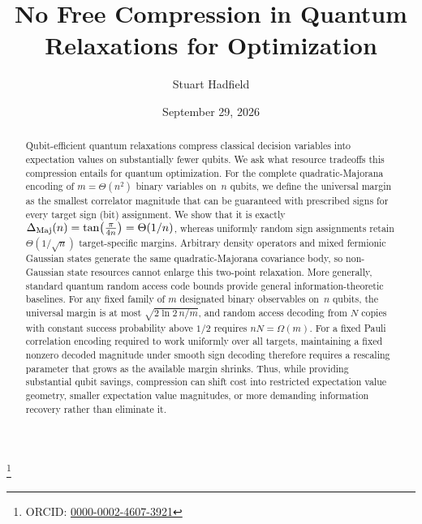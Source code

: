 \documentclass[10pt,aps,pra,twocolumn,superscriptaddress,nofootinbib,longbibliography]{revtex4-2}
\begin{document}
\title{No Free Compression in Quantum Relaxations for Optimization}

\author{Stuart Hadfield}
\thanks{ORCID: \href{https://orcid.org/0000-0002-4607-3921}{0000-0002-4607-3921}}

\date{September 29, 2026}

\begin{abstract}
Qubit-efficient quantum relaxations compress classical decision variables into expectation values on substantially fewer qubits.  We ask what resource tradeoffs this compression entails for quantum optimization.  For the complete quadratic-Majorana encoding of $m=\Theta(n^2)$ binary variables on~$n$ qubits, we define the universal margin as the smallest correlator magnitude that can be guaranteed with prescribed signs for every target sign (bit) assignment.  We show that it is exactly $\Delta_{\rm Maj}(n)=\tan\!\left(\frac{\pi}{4n}\right)=\Theta(1/n)$, whereas uniformly random sign assignments retain $\Theta(1/\sqrt n)$ target-specific margins.  Arbitrary density operators and mixed fermionic Gaussian states generate the same quadratic-Majorana covariance body, so non-Gaussian state resources cannot enlarge this two-point relaxation.  More generally, standard quantum random access code bounds provide general information-theoretic baselines.  For any fixed family of $m$ designated binary observables on~$n$ qubits, the universal margin is at most $\sqrt{2\ln2\,n/m}$, and random access decoding from $N$ copies with constant success probability above $1/2$ requires $nN=\Omega(m)$.  For a fixed Pauli correlation encoding required to work uniformly over all targets, maintaining a fixed nonzero decoded magnitude under smooth sign decoding therefore requires a rescaling parameter that grows as the available margin shrinks.  Thus, while providing substantial qubit savings, compression can shift cost into restricted expectation value geometry, smaller expectation value magnitudes, or more demanding information recovery rather than eliminate it.
\end{abstract}


\maketitle
\end{document}
